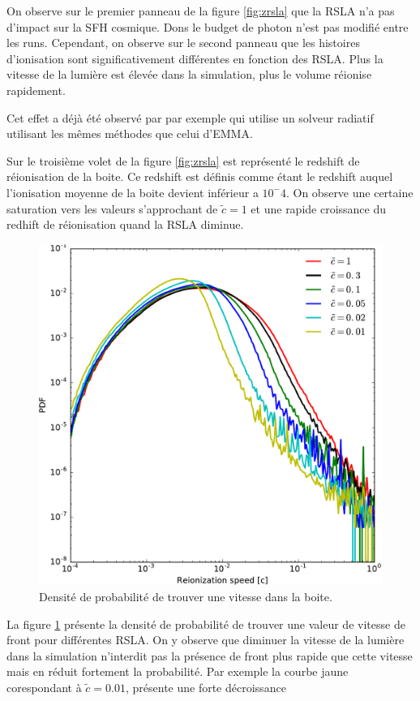 On observe sur le premier panneau de la figure \ref{fig:zrsla} que la \ac{RSLA} n'a pas d'impact sur la \ac{SFH} cosmique.
Dons le budget de photon n'est pas modifié entre les runs.
Cependant, on observe sur le second panneau que les histoires d'ionisation sont significativement différentes en fonction des \ac{RSLA}.
Plus la vitesse de la lumière est élevée dans la simulation, plus le volume réionise rapidement.

Cet effet a déjà été observé par \cite{rosdahl_ramsesrt_2013} par exemple qui utilise un solveur radiatif utilisant les mêmes méthodes que celui d'EMMA.

Sur le troisième volet de la figure \ref{fig:zrsla} est représenté le redshift de réionisation de la boite.
Ce redshift est définis comme étant le redshift auquel l'ionisation moyenne de la boite devient inférieur a $10^-{4}$.
On observe une certaine saturation vers les valeurs s'approchant de $\tilde{c}=1$ et une rapide croissance du redhift de réionisation quand la \ac{RSLA} diminue.


\begin{figure}[htpb]
        \includegraphics[width=.95\linewidth]{img/04_mapreio/PDF_v_reio.pdf} 
        \caption{Densité de probabilité de trouver une vitesse dans la boite.
        }
 		\label{fig:pdfv}
\end{figure}

La figure \ref{fig:pdfv} présente la densité de probabilité de trouver une valeur de vitesse de front pour différentes \ac{RSLA}.
On y observe que diminuer la vitesse de la lumière dans la simulation n'interdit pas la présence de front plus rapide que cette vitesse mais en réduit fortement la probabilité.
Par exemple la courbe jaune corespondant à $\tilde{c}=0.01$, présente une forte décroissance 


